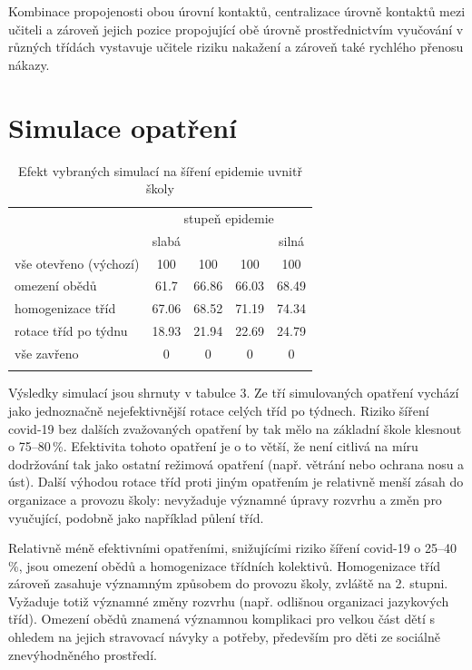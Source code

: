 Kombinace propojenosti obou úrovní kontaktů, centralizace úrovně kontaktů mezi učiteli a zároveň jejich pozice propojující obě úrovně prostřednictvím vyučování v různých třídách vystavuje učitele riziku nakažení a zároveň také rychlého přenosu nákazy. 

    
\section*{Simulace opatření} 

\begin{table}[]
    \centering
    \caption{Efekt vybraných simulací na šíření epidemie uvnitř školy}
\begin{tabular}{lcccc}
\hline
                       & \multicolumn{4}{c}{stupeň epidemie} \\ 
                       & slabá   &         &        & silná  \\ \hline
vše otevřeno (výchozí) & 100     & 100     & 100    & 100    \\
omezení obědů          & 61.7    & 66.86   & 66.03  & 68.49  \\
homogenizace tříd      & 67.06   & 68.52   & 71.19  & 74.34  \\
rotace tříd po týdnu   & 18.93   & 21.94   & 22.69  & 24.79  \\
vše zavřeno            & 0       & 0       & 0      & 0      \\ \hline
\label{tab:100-sims}
\end{tabular}
\end{table}

Výsledky simulací jsou shrnuty v tabulce 3. Ze tří simulovaných opatření vychází jako jednoznačně nejefektivnější rotace celých tříd po týdnech. Riziko šíření covid-19 bez dalších zvažovaných opatření by tak mělo na základní škole klesnout o 75--80\,\%. Efektivita tohoto opatření je o to větší, že není citlivá na míru dodržování tak jako ostatní režimová opatření (např. větrání nebo ochrana nosu a úst). Další výhodou rotace tříd proti jiným opatřením je relativně menší zásah do organizace a provozu školy: nevyžaduje významné úpravy rozvrhu a změn pro vyučující, podobně jako například půlení tříd.

Relativně méně efektivními opatřeními, snižujícími riziko šíření covid-19 o 25--40\,\%, jsou omezení obědů a homogenizace třídních kolektivů. Homogenizace tříd zároveň zasahuje významným způsobem do provozu školy, zvláště na 2. stupni. Vyžaduje totiž významné změny rozvrhu (např. odlišnou organizaci jazykových tříd). Omezení obědů znamená významnou komplikaci pro velkou část dětí s ohledem na jejich stravovací návyky a potřeby, především pro děti ze sociálně znevýhodněného prostředí.



